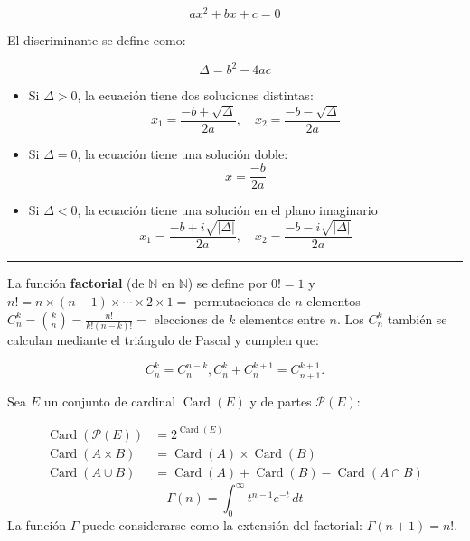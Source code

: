 \begin{f}  
	\[
	ax^2 + bx + c = 0
	\]
	
	El discriminante se define como:
	
	\[
	\Delta = b^2 - 4ac
	\]
	
	\begin{itemize}
		\item Si \(\Delta > 0\), la ecuación tiene dos soluciones distintas:
		\[
		x_1 = \frac{-b + \sqrt{\Delta}}{2a}, \quad x_2 = \frac{-b - \sqrt{\Delta}}{2a}
		\]
		\item Si \(\Delta = 0\), la ecuación tiene una solución doble:
		\[
		x = \frac{-b}{2a}
		\]
		\item Si \(\Delta < 0\), la ecuación tiene una solución en el plano imaginario
		\[
		x_1 = \frac{-b + i\sqrt{\lvert\Delta\rvert}}{2a}, \quad x_2 = \frac{-b - i\sqrt{\lvert\Delta\rvert}}{2a}
		\]
	\end{itemize}
\end{f}
\hrule
\begin{f}  
	
	La función \textbf{factorial} (de \(\mathbb{N}\) en \(\mathbb{N}\)) se define por \(0!=1\) y \(n!=n \times(n-1) \times \cdots \times 2 \times 1=\) permutaciones de \(n\) elementos \(\displaystyle C_n^k=\binom{k}{n}=\frac{n!}{k!(n-k)!}=\) elecciones de \(k\) elementos entre \(n\). Los \(C_n^k\) también se calculan mediante el triángulo de Pascal y cumplen que:
	
	\[
	C_n^k=C_n^{n-k}, C_n^k+C_n^{k+1}=C_{n+1}^{k+1} .
	\]
	
	
	Sea \(E\) un conjunto de cardinal \(\operatorname{Card}(E)\) y de partes \(\mathcal{P}(E)\):


\[
\begin{aligned}
\operatorname{Card}(\mathcal{P}(E)) & =2^{\operatorname{Card}(E)} \\
\operatorname{Card}(A \times B) & =\operatorname{Card}(A) \times \operatorname{Card}(B) \\
\operatorname{Card}(A \cup B) & =\operatorname{Card}(A)+\operatorname{Card}(B)-\operatorname{Card}(A \cap B)
\end{aligned}
\]
\[ \Gamma(n) = \int_0^\infty t^{n-1} e^{-t} \, dt \]
La función \(\Gamma\) puede considerarse como la extensión del factorial: \(\Gamma(n+1)=n!\).
\end{f}

